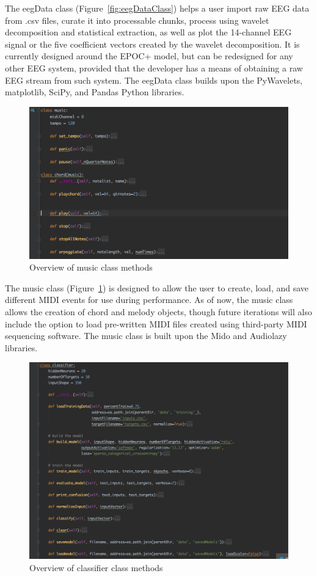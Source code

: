 \bigskip
The eegData class (Figure~\ref{fig:eegDataClass}) helps a user import raw EEG data from .csv files, curate it into processable chunks, process using wavelet decomposition and statistical extraction, as well as plot the 14-channel EEG signal or the five coefficient vectors created by the wavelet decomposition. It is currently designed around the EPOC+ model, but can be redesigned for any other EEG system, provided that the developer has a means of obtaining a raw EEG stream from such system. The eegData class builds upon the PyWavelets, matplotlib, SciPy, and Pandas Python libraries. 

\begin{figure}[H]
	\centering
		\includegraphics[width=1\columnwidth]{musicClass.png}
	\caption{Overview of music class methods}
	\label{fig:musicClass}
\end{figure} 

	The music class (Figure~\ref{fig:musicClass}) is designed to allow the user to create, load, and save different MIDI events for use during performance. As of now, the music class allows the creation of chord and melody objects, though future iterations will also include the option to load pre-written MIDI files created using third-party MIDI sequencing software. The music class is built upon the Mido and Audiolazy libraries. 

\begin{figure}[H]
	\centering
		\includegraphics[width=1\columnwidth]{classifierClass.png}
	\caption{Overview of classifier class methods}
	\label{fig:classifierClass}
\end{figure} 
 
